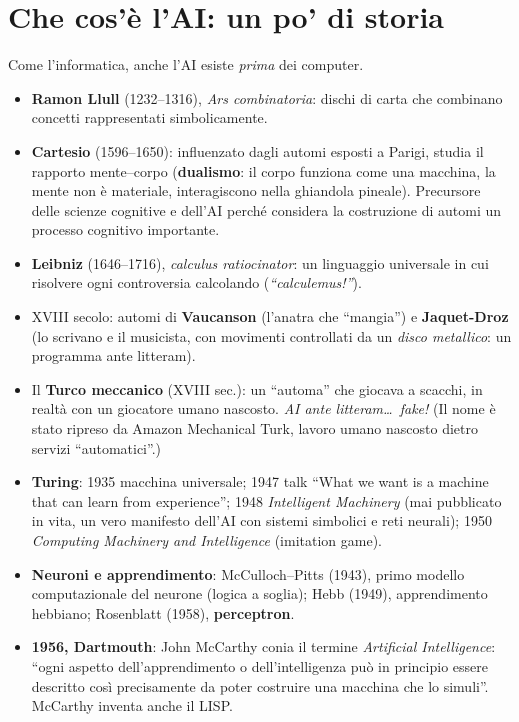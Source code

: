 \section{Che cos'è l'AI: un po' di storia}

Come l'informatica, anche l'AI esiste \emph{prima} dei computer.

\begin{itemize}
  \item \textbf{Ramon Llull} (1232--1316), \emph{Ars combinatoria}: dischi di
        carta che combinano concetti rappresentati simbolicamente.
  \item \textbf{Cartesio} (1596--1650): influenzato dagli automi esposti a
        Parigi, studia il rapporto mente--corpo (\textbf{dualismo}: il corpo
        funziona come una macchina, la mente non è materiale, interagiscono
        nella ghiandola pineale). Precursore delle scienze cognitive e
        dell'AI perché considera la costruzione di automi un processo
        cognitivo importante.
  \item \textbf{Leibniz} (1646--1716), \emph{calculus ratiocinator}: un
        linguaggio universale in cui risolvere ogni controversia calcolando
        (\emph{``calculemus!''}).
  \item XVIII secolo: automi di \textbf{Vaucanson} (l'anatra che ``mangia'') e
        \textbf{Jaquet-Droz} (lo scrivano e il musicista, con movimenti
        controllati da un \emph{disco metallico}: un programma ante litteram).
  \item Il \textbf{Turco meccanico} (XVIII sec.): un ``automa'' che giocava a
        scacchi, in realtà con un giocatore umano nascosto. \emph{AI ante
        litteram\dots\ fake!} (Il nome è stato ripreso da Amazon Mechanical
        Turk, lavoro umano nascosto dietro servizi ``automatici''.)
  \item \textbf{Turing}: 1935 macchina universale; 1947 talk ``What we want is
        a machine that can learn from experience''; 1948 \emph{Intelligent
        Machinery} (mai pubblicato in vita, un vero manifesto dell'AI con
        sistemi simbolici e reti neurali); 1950 \emph{Computing Machinery and
        Intelligence} (imitation game).
  \item \textbf{Neuroni e apprendimento}: McCulloch--Pitts (1943), primo
        modello computazionale del neurone (logica a soglia); Hebb (1949),
        apprendimento hebbiano; Rosenblatt (1958), \textbf{perceptron}.
  \item \textbf{1956, Dartmouth}: John McCarthy conia il termine
        \emph{Artificial Intelligence}: ``ogni aspetto dell'apprendimento o
        dell'intelligenza può in principio essere descritto così precisamente
        da poter costruire una macchina che lo simuli''. McCarthy inventa
        anche il LISP.
\end{itemize}

